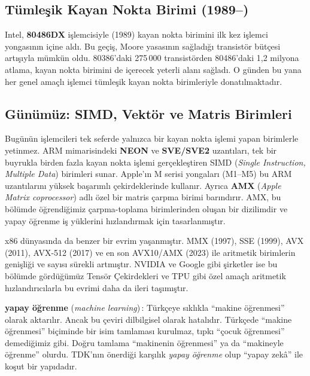 \subsection{Tümleşik Kayan Nokta Birimi (1989--)}
Intel, \textbf{80486DX} işlemcisiyle (1989) kayan nokta birimini ilk kez işlemci yongasının içine aldı. Bu geçiş, Moore yasasının sağladığı transistör bütçesi artışıyla mümkün oldu. 80386'daki 275\,000 transistörden 80486'daki 1,2 milyona atlama, kayan nokta birimini de içerecek yeterli alanı sağladı. O günden bu yana her genel amaçlı işlemci tümleşik kayan nokta birimleriyle donatılmaktadır.

\subsection{Günümüz: SIMD, Vektör ve Matris Birimleri}
Bugünün işlemcileri tek seferde yalnızca bir kayan nokta işlemi yapan birimlerle yetinmez. ARM mimarisindeki \textbf{NEON} ve \textbf{SVE/SVE2} uzantıları, tek bir buyrukla birden fazla kayan nokta işlemi gerçekleştiren SIMD (\emph{Single Instruction, Multiple Data}) birimleri sunar. Apple'ın M serisi yongaları (M1--M5) bu ARM uzantılarını yüksek başarımlı çekirdeklerinde kullanır. Ayrıca \textbf{AMX} (\emph{Apple Matrix coprocessor}) adlı özel bir matris çarpma birimi barındırır. AMX, bu bölümde öğrendiğimiz çarpma-toplama birimlerinden oluşan bir dizilimdir ve yapay öğrenme iş yüklerini hızlandırmak için tasarlanmıştır.

x86 dünyasında da benzer bir evrim yaşanmıştır. MMX (1997), SSE (1999), AVX (2011), AVX-512 (2017) ve en son AVX10/AMX (2023) ile aritmetik birimlerin genişliği ve sayısı sürekli artmıştır. NVIDIA ve Google gibi şirketler ise bu bölümde gördüğümüz Tensör Çekirdekleri ve TPU gibi özel amaçlı aritmetik hızlandırıcılarla bu evrimi daha da ileri taşımıştır.

\begin{terimnotu}
\textbf{yapay öğrenme} (\emph{machine learning})\,: Türkçeye sıklıkla ``makine öğrenmesi'' olarak aktarılır. Ancak bu çeviri dilbilgisel olarak hatalıdır. Türkçede ``makine öğrenmesi'' biçiminde bir isim tamlaması kurulmaz, tıpkı ``çocuk öğrenmesi'' demediğimiz gibi. Doğru tamlama ``makinenin öğrenmesi'' ya da ``makineyle öğrenme'' olurdu. TDK'nın önerdiği karşılık \emph{yapay öğrenme} olup ``yapay zekâ'' ile koşut bir yapıdadır.
\end{terimnotu}

